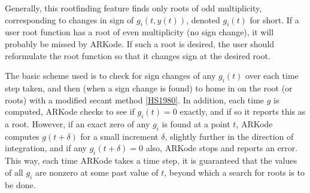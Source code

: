\documentclass[letterpaper,10pt,english]{sphinxmanual}
\begin{document}
Generally, this rootfinding feature finds only roots of odd
multiplicity, corresponding to changes in sign of $g_i(t,
y(t))$, denoted $g_i(t)$ for short. If a user root function has
a root of even multiplicity (no sign change), it will probably be
missed by ARKode. If such a root is desired, the user should
reformulate the root function so that it changes sign at the desired
root.

The basic scheme used is to check for sign changes of any
$g_i(t)$ over each time step taken, and then (when a sign change
is found) to home in on the root (or roots) with a modified secant
method {\hyperref[References:hs1980]{{[}HS1980{]}}}.  In addition, each time $g$ is
computed, ARKode checks to see if $g_i(t) = 0$ exactly, and if
so it reports this as a root. However, if an exact zero of any
$g_i$ is found at a point $t$, ARKode computes
$g(t+\delta)$ for a small increment $\delta$, slightly
further in the direction of integration, and if any
$g_i(t+\delta) = 0$ also, ARKode stops and reports an
error. This way, each time ARKode takes a time step, it is guaranteed
that the values of all $g_i$ are nonzero at some past value of
$t$, beyond which a search for roots is to be done.
\end{document}
